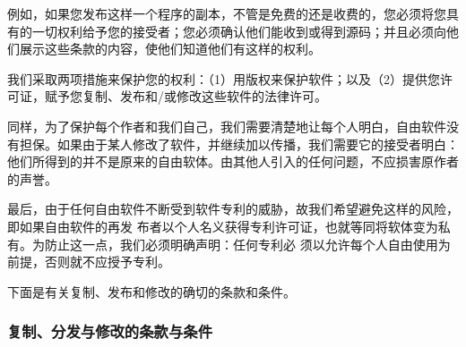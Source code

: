 例如，如果您发布这样一个程序的副本，不管是免费的还是收费的，您必须将您具有的一切权利给予您的接受者；您必须确认他们能收到或得到源码；并且必须向他们展示这些条款的内容，使他们知道他们有这样的权利。


我们采取两项措施来保护您的权利：（1）用版权来保护软件；以及（2）提供您许可证，赋予您复制、发布和/或修改这些软件的法律许可。


同样，为了保护每个作者和我们自己，我们需要清楚地让每个人明白，自由软件没有担保。如果由于某人修改了软件，并继续加以传播，我们需要它的接受者明白：他们所得到的并不是原来的自由软体。由其他人引入的任何问题，不应损害原作者的声誉。


最后，由于任何自由软件不断受到软件专利的威胁，故我们希望避免这样的风险，即如果自由软件的再发 布者以个人名义获得专利许可证，也就等同将软体变为私有。为防止这一点，我们必须明确声明：任何专利必 须以允许每个人自由使用为前提，否则就不应授予专利。


下面是有关复制、发布和修改的确切的条款和条件。


\subsubsection{复制、分发与修改的条款与条件}

